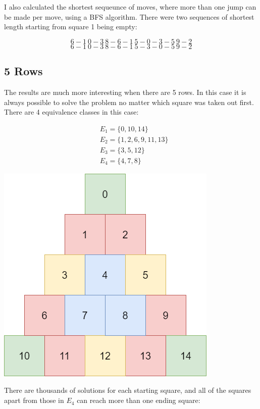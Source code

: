 \documentclass{article}
\begin{document}
I also calculated the shortest sequeunce of moves, where more than one jump can be made per move, using a BFS algorithm. There were two sequences of shortest length starting from square 1 being empty:

$$ 6-1 \  0-3 \  8-6-1 \  5-0-3-5 \ 9-2 $$
$$ 6-1 \  0-3 \  8-6-1 \  5-3-0-5 \ 9-2 $$

\subsection{5 Rows}

The results are much more interesting when there are 5 rows. In this case it is always possible to solve the problem no matter which square was taken out first. There are 4 equivalence classes in this case:

\begin{center}
\begin{align*}
    & E_1 = \{0, 10, 14\} \\
    & E_2 = \{1, 2, 6, 9, 11, 13\} \\
    & E_3 = \{3, 5, 12\} \\
    & E_4 = \{4, 7, 8\}
\end{align*}
\end{center}

\begin{center}
    \includegraphics[width=0.3\linewidth]{"./Images/EquivalenceClasses.png"}
\end{center}

There are thousands of solutions for each starting square, and all of the squares apart from those in $E_4$ can reach more than one ending square:
\end{document}

